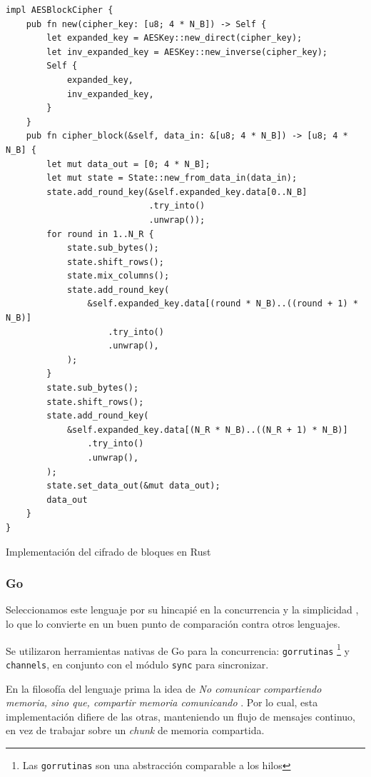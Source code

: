 \documentclass[11pt]{article}
\let\Oldsubsubsection\subsubsection
\renewcommand{\subsubsection}{\FloatBarrier\Oldsubsubsection}
\newcommand{\english}[1]{\textit{#1}}
\newcommand{\technical}[1]{\textit{#1}}
\begin{document}
\begin{listing}[h]
\begin{verbatim}
impl AESBlockCipher {
    pub fn new(cipher_key: [u8; 4 * N_B]) -> Self {
        let expanded_key = AESKey::new_direct(cipher_key);
        let inv_expanded_key = AESKey::new_inverse(cipher_key);
        Self {
            expanded_key,
            inv_expanded_key,
        }
    }
    pub fn cipher_block(&self, data_in: &[u8; 4 * N_B]) -> [u8; 4 * N_B] {
        let mut data_out = [0; 4 * N_B];
        let mut state = State::new_from_data_in(data_in);
        state.add_round_key(&self.expanded_key.data[0..N_B]
                            .try_into()
                            .unwrap());
        for round in 1..N_R {
            state.sub_bytes();
            state.shift_rows();
            state.mix_columns();
            state.add_round_key(
                &self.expanded_key.data[(round * N_B)..((round + 1) * N_B)]
                    .try_into()
                    .unwrap(),
            );
        }
        state.sub_bytes();
        state.shift_rows();
        state.add_round_key(
            &self.expanded_key.data[(N_R * N_B)..((N_R + 1) * N_B)]
                .try_into()
                .unwrap(),
        );
        state.set_data_out(&mut data_out);
        data_out
    }
}
\end{verbatim}
\caption{Implementación del cifrado de bloques en Rust}
\label{code:aes:rust_cipher_block}
\end{listing}

\subsubsection{Go}

Seleccionamos este lenguaje por su hincapié en la concurrencia \cite{go:ex:concurrency_patterns} y la simplicidad \cite{go:ex:simple}, lo que lo convierte en un buen punto de comparación contra otros lenguajes.

Se utilizaron herramientas nativas de Go para la concurrencia: \lstinline{gorrutinas} \footnote{Las \lstinline{gorrutinas} son una abstracción comparable a los hilos} y \lstinline{channels}, en conjunto con el módulo \lstinline{sync} para sincronizar.

En la filosofía del lenguaje prima la idea de \technical{No comunicar compartiendo memoria, sino que, compartir memoria comunicando} \cite{go:ex:sharing}. Por lo cual, esta implementación difiere de las otras, manteniendo un flujo de mensajes continuo, en vez de trabajar sobre un \english{chunk} de memoria compartida.
\end{document}

